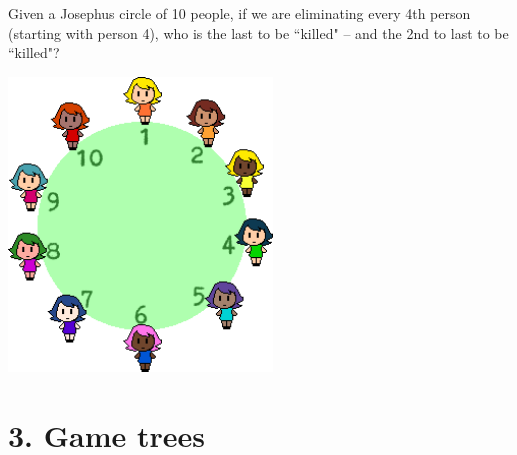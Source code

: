 \documentclass[a4paper,12pt]{book}
\newcounter{question}
\begin{document}
        \begin{questionNOGRADE}{\thequestion}
            Given a Josephus circle of 10 people,
            if we are eliminating every 4th person (starting with person 4),
            who is the last to be ``killed" – and the 2nd to last to be ``killed"?

            \begin{center}
                \includegraphics[width=7cm]{images/josephus-10.png}
            \end{center}
        \end{questionNOGRADE}
       
    \newpage
    \section*{3. Game trees}
\end{document}
